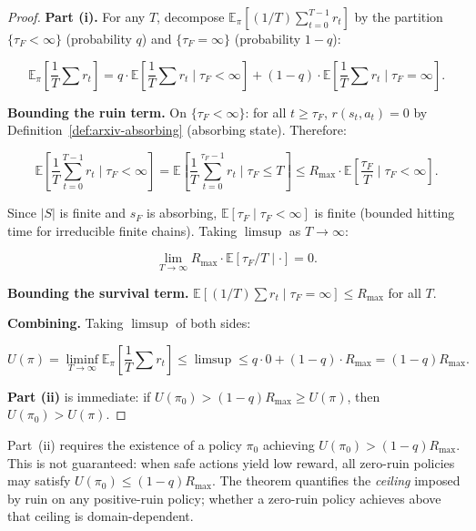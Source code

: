 \begin{proof}
\medskip\noindent\textbf{Part (i).}
For any $T$, decompose
$\mathbb{E}_\pi[(1/T) \sum_{t=0}^{T-1} r_t]$ by the partition
$\{\tau_F < \infty\}$ (probability $q$) and $\{\tau_F = \infty\}$
(probability $1 - q$):

\begin{equation}
\mathbb{E}_\pi\!\left[\frac{1}{T} \sum r_t\right]
= q \cdot \mathbb{E}\!\left[
\frac{1}{T} \sum r_t \mid \tau_F < \infty
\right]
+ (1 - q) \cdot \mathbb{E}\!\left[
\frac{1}{T} \sum r_t \mid \tau_F = \infty
\right].
\end{equation}

\medskip\noindent\textbf{Bounding the ruin term.}
On $\{\tau_F < \infty\}$: for all $t \ge \tau_F$, $r(s_t, a_t) = 0$
by Definition~\ref{def:arxiv-absorbing} (absorbing state).
Therefore:

\begin{equation}
\mathbb{E}\!\left[\frac{1}{T} \sum_{t=0}^{T-1} r_t \mid
\tau_F < \infty\right]
= \mathbb{E}\!\left[\frac{1}{T} \sum_{t=0}^{\tau_F - 1} r_t \mid
\tau_F \le T\right]
\le R_{\max} \cdot \mathbb{E}\!\left[\frac{\tau_F}{T} \mid
\tau_F < \infty\right].
\end{equation}

Since $|S|$ is finite and $s_F$ is absorbing,
$\mathbb{E}[\tau_F \mid \tau_F < \infty]$ is finite (bounded hitting
time for irreducible finite chains). Taking $\limsup$ as $T \to
\infty$:

\begin{equation}
\lim_{T \to \infty} R_{\max} \cdot
\mathbb{E}[\tau_F / T \mid \cdot] = 0.
\end{equation}

\medskip\noindent\textbf{Bounding the survival term.}
$\mathbb{E}[(1/T) \sum r_t \mid \tau_F = \infty] \le R_{\max}$ for
all $T$.

\medskip\noindent\textbf{Combining.}
Taking $\limsup$ of both sides:

\begin{equation}
U(\pi) = \liminf_{T \to \infty}
\mathbb{E}_\pi\!\left[\frac{1}{T} \sum r_t\right]
\le \limsup
\le q \cdot 0 + (1 - q) \cdot R_{\max}
= (1 - q) R_{\max}.
\end{equation}

\medskip\noindent\textbf{Part (ii)}
is immediate: if $U(\pi_0) > (1 - q) R_{\max} \ge U(\pi)$, then
$U(\pi_0) > U(\pi)$.
\end{proof}

\begin{remark}[Scope]
\label{rem:arxiv-thm1-scope}
Part~(ii) requires the existence of a policy $\pi_0$ achieving
$U(\pi_0) > (1 - q) R_{\max}$. This is not guaranteed: when safe
actions yield low reward, all zero-ruin policies may satisfy
$U(\pi_0) \le (1 - q) R_{\max}$. The theorem quantifies the
\emph{ceiling} imposed by ruin on any positive-ruin policy; whether
a zero-ruin policy achieves above that ceiling is domain-dependent.
\end{remark}

